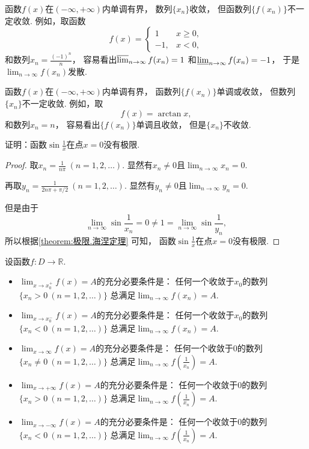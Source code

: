 \begin{example}
函数\(f(x)\)在\((-\infty,+\infty)\)内单调有界，
数列\(\{x_n\}\)收敛，
但函数列\(\{f(x_n)\}\)不一定收敛.
例如，取函数\[
	f(x) = \left\{ \begin{array}{rl}
		1 & x\geq0, \\
		-1, & x<0,
	\end{array} \right.
\]
和数列\(x_n = \frac{(-1)^n}{n}\)，
容易看出\(\varlimsup_{n\to\infty} f(x_n) = 1\)
和\(\varliminf_{n\to\infty} f(x_n) = -1\)，
于是\(\lim_{n\to\infty} f(x_n)\)发散.
\end{example}

\begin{example}
函数\(f(x)\)在\((-\infty,+\infty)\)内单调有界，
函数列\(\{f(x_n)\}\)单调或收敛，
但数列\(\{x_n\}\)不一定收敛.
例如，取\[
	f(x) = \arctan x,
\]
和数列\(x_n = n\)，
容易看出\(\{f(x_n)\}\)单调且收敛，
但是\(\{x_n\}\)不收敛.
\end{example}

\begin{example}
证明：函数\(\sin\frac1x\)在点\(x=0\)没有极限.
\begin{proof}
取\(x_n = \frac1{n\pi}\ (n=1,2,\dotsc)\).
显然有\(x_n\neq0\)且\(\lim_{n\to\infty} x_n = 0\).

再取\(y_n = \frac1{2n\pi+\pi/2}\ (n=1,2,\dotsc)\).
显然有\(y_n\neq0\)且\(\lim_{n\to\infty} y_n = 0\).

但是由于\[
	\lim_{n\to\infty} \sin\frac1{x_n} = 0
	\neq 1 = \lim_{n\to\infty} \sin\frac1{y_n},
\]
所以根据\cref{theorem:极限.海涅定理} 可知，
函数\(\sin\frac1x\)在点\(x=0\)没有极限.
\end{proof}
\end{example}

\begin{corollary}
设函数\(f\colon D\to\mathbb{R}\).
\begin{itemize}
	\item \(\lim_{x \to x_0^+} f(x) = A\)的充分必要条件是：
	任何一个收敛于\(x_0\)的数列\(\{x_n>0\ (n=1,2,\dotsc)\}\)
	总满足\(\lim_{n\to\infty} f(x_n) = A\).

	\item \(\lim_{x \to x_0^-} f(x) = A\)的充分必要条件是：
	任何一个收敛于\(x_0\)的数列\(\{x_n<0\ (n=1,2,\dotsc)\}\)
	总满足\(\lim_{n\to\infty} f(x_n) = A\).

	\item \(\lim_{x\to\infty} f(x) = A\)的充分必要条件是：
	任何一个收敛于\(0\)的数列\(\{x_n\neq0\ (n=1,2,\dotsc)\}\)
	总满足\(\lim_{n\to\infty} f\left(\frac1{x_n}\right) = A\).

	\item \(\lim_{x\to+\infty} f(x) = A\)的充分必要条件是：
	任何一个收敛于\(0\)的数列\(\{x_n>0\ (n=1,2,\dotsc)\}\)
	总满足\(\lim_{n\to\infty} f\left(\frac1{x_n}\right) = A\).

	\item \(\lim_{x\to-\infty} f(x) = A\)的充分必要条件是：
	任何一个收敛于\(0\)的数列\(\{x_n<0\ (n=1,2,\dotsc)\}\)
	总满足\(\lim_{n\to\infty} f\left(\frac1{x_n}\right) = A\).
\end{itemize}
\end{corollary}
